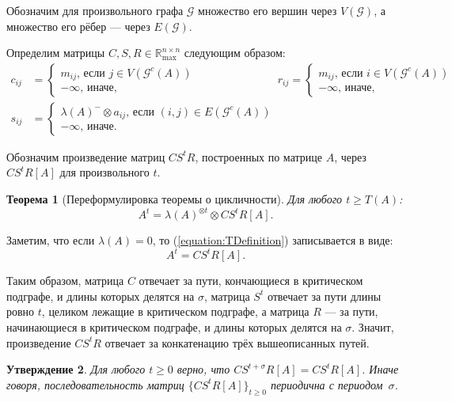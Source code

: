 \documentclass[12pt]{article}
\newtheorem{theorem}{Теорема}[section]
\newtheorem{proposition}[theorem]{Утверждение}
\theoremstyle{definition}
\begin{document}
Обозначим для произвольного графа $\mathcal{G}$ множество его вершин через $V(\mathcal{G})$, а множество его рёбер --- через $E(\mathcal{G})$.

Определим матрицы $C, S, R \in \mathbb{R}_{\max}^{n \times n}$ следующим образом:
\begin{align*}
    c_{ij} &= \begin{cases}
        m_{ij}\text{, если } j \in V(\mathcal{G}^c(A)) \\
        -\infty \text{, иначе,}
    \end{cases}
    &
    r_{ij} = \begin{cases}
        m_{ij}\text{, если } i \in V(\mathcal{G}^c(A)) \\
        -\infty \text{, иначе,}
    \end{cases}
    \\
    s_{ij} &= \begin{cases}
        \lambda(A)^- \otimes a_{ij}\text{, если } (i, j) \in E(\mathcal{G}^c(A)) \\
        -\infty \text{, иначе.}
    \end{cases}
\end{align*}

Обозначим произведение матриц $CS^tR$, построенных по матрице $A$, через $CS^tR[A]$ для произвольного $t$.

\begin{theorem} [Переформулировка теоремы о цикличности] \cite[теорема 2.2]{15WeakCSRExpantion}
\label{theorem:CSRdecompositionTheorem}
Для любого $t \ge T(A)$:
\begin{equation}
\label{equation:TDefinition}
    A^t = \lambda(A)^{\otimes t} \otimes CS^tR[A].
\end{equation}
\end{theorem}

Заметим, что если $\lambda(A) = 0$, то (\ref{equation:TDefinition}) записывается в виде:
\begin{equation*}
    A^t = CS^tR[A].
\end{equation*}

Таким образом, матрица $C$ отвечает за пути, кончающиеся в критическом подграфе, и длины которых делятся на $\sigma$, матрица $S^t$ отвечает за пути длины ровно $t$, целиком лежащие в критическом подграфе, а матрица $R$ --- за пути, начинающиеся в критическом подграфе, и длины которых делятся на $\sigma$. Значит, произведение $CS^tR$ отвечает за конкатенацию трёх вышеописанных путей.

\begin{proposition} \cite[утверждение 3.2]{21CSRExpansionsOfMatrixPowersInMaxAlgebra}
\label{periodicity}
Для любого $t \ge 0$ верно, что 
$CS^{t+\sigma}R[A] = CS^tR[A]$. Иначе говоря, последовательность матриц $\{ CS^tR[A]\}_{t\ge0}$ периодична с периодом~$\sigma$.
\end{proposition}
\end{document}

